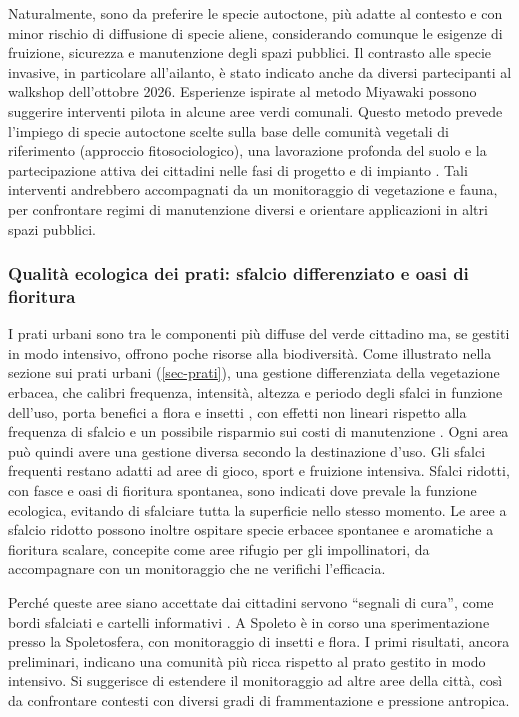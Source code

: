 \documentclass[
  a4paper,
]{book}
\begin{document}
Naturalmente, sono da preferire le specie autoctone, più adatte al contesto e con minor rischio di diffusione di specie aliene, considerando comunque le esigenze di fruizione, sicurezza e manutenzione degli spazi pubblici.
Il contrasto alle specie invasive, in particolare all'ailanto, è stato indicato anche da diversi partecipanti al walkshop dell'ottobre 2026. Esperienze ispirate al metodo Miyawaki possono suggerire interventi pilota in alcune aree verdi comunali.
Questo metodo prevede l'impiego di specie autoctone scelte sulla base delle comunità vegetali di riferimento (approccio fitosociologico), una lavorazione profonda del suolo e la partecipazione attiva dei cittadini nelle fasi di progetto e di impianto \citep{miyawaki1998}.
Tali interventi andrebbero accompagnati da un monitoraggio di vegetazione e fauna, per confrontare regimi di manutenzione diversi e orientare applicazioni in altri spazi pubblici.

\subsubsection{Qualità ecologica dei prati: sfalcio differenziato e oasi di fioritura}\label{qualituxe0-ecologica-dei-prati-sfalcio-differenziato-e-oasi-di-fioritura}

I prati urbani sono tra le componenti più diffuse del verde cittadino ma, se gestiti in modo intensivo, offrono poche risorse alla biodiversità.
Come illustrato nella sezione sui prati urbani (\ref{sec-prati}), una gestione differenziata della vegetazione erbacea, che calibri frequenza, intensità, altezza e periodo degli sfalci in funzione dell'uso, porta benefici a flora e insetti \citep{sehrt2020, proske2022}, con effetti non lineari rispetto alla frequenza di sfalcio \citep{lerman2018} e un possibile risparmio sui costi di manutenzione \citep{watson2020}.
Ogni area può quindi avere una gestione diversa secondo la destinazione d'uso.
Gli sfalci frequenti restano adatti ad aree di gioco, sport e fruizione intensiva.
Sfalci ridotti, con fasce e oasi di fioritura spontanea, sono indicati dove prevale la funzione ecologica, evitando di sfalciare tutta la superficie nello stesso momento.
Le aree a sfalcio ridotto possono inoltre ospitare specie erbacee spontanee e aromatiche a fioritura scalare, concepite come aree rifugio per gli impollinatori, da accompagnare con un monitoraggio che ne verifichi l'efficacia.

Perché queste aree siano accettate dai cittadini servono ``segnali di cura'', come bordi sfalciati e cartelli informativi \citep{nassauer1995, garbuzov2015}.
A Spoleto è in corso una sperimentazione presso la Spoletosfera, con monitoraggio di insetti e flora.
I primi risultati, ancora preliminari, indicano una comunità più ricca rispetto al prato gestito in modo intensivo.
Si suggerisce di estendere il monitoraggio ad altre aree della città, così da confrontare contesti con diversi gradi di frammentazione e pressione antropica.
\end{document}
